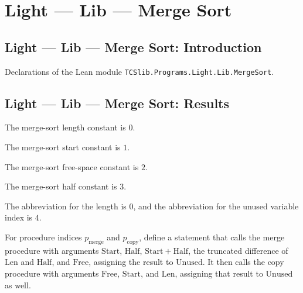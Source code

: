\section{Light --- Lib --- Merge Sort}
\subsection*{Light --- Lib --- Merge Sort: Introduction}

Declarations of the Lean module \texttt{TCSlib.Programs.Light.Lib.MergeSort}.

\subsection*{Light --- Lib --- Merge Sort: Results}

\begin{definition}
\label{Light.MergeSort.Len}
\leanok
The merge-sort length constant is $0$.
\end{definition}

\begin{definition}
\label{Light.MergeSort.Start}
\leanok
{}
The merge-sort start constant is $1$.
\end{definition}

\begin{definition}
\label{Light.MergeSort.Free}
\leanok
{}
The merge-sort free-space constant is $2$.
\end{definition}

\begin{definition}
\label{Light.MergeSort.Half}
\leanok
{}
The merge-sort half constant is $3$.
\end{definition}

\begin{definition}
\label{Light.MergeSort.Unused}
\leanok
{}
The abbreviation for the length is $0$, and the abbreviation for the unused variable
index is $4$.
\end{definition}

\begin{definition}
\label{Light.sortJoin}
\leanok
{}
For procedure indices $p_{\mathrm{merge}}$ and $p_{\mathrm{copy}}$, define a statement
that calls the merge procedure with arguments $\mathrm{Start}$, $\mathrm{Half}$,
$\mathrm{Start}+\mathrm{Half}$, the truncated difference of $\mathrm{Len}$ and
$\mathrm{Half}$, and $\mathrm{Free}$, assigning the result to $\mathrm{Unused}$. It then
calls the copy procedure with arguments $\mathrm{Free}$, $\mathrm{Start}$, and
$\mathrm{Len}$, assigning that result to $\mathrm{Unused}$ as well.
\end{definition}

